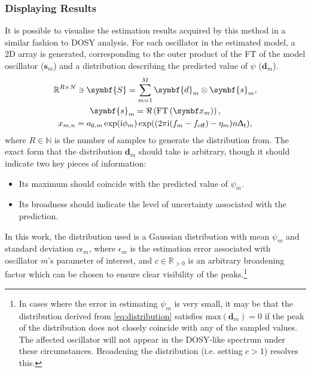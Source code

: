 \subsubsection{Displaying Results}
It is possible to visualise the estimation results acquired by this method in a
similar fashion to \ac{DOSY} analysis. For each oscillator in the estimated
model, a \ac{2D} array is generated, corresponding to the outer product of the
\ac{FT} of the model oscillator ($\symbf{s}_m$) and a distribution describing
the predicted value of $\psi$ ($\symbf{d}_m$).
\begin{subequations}
    \begin{gather}
        \mathbb{R}^{R \times N} \ni \symbf{S} = \sum_{m=1}^{M}
        \symbf{d}_m \otimes
        \symbf{s}_m ,\label{eq:dosy-spectrum}\\
        \symbf{s}_m = \Re\left(\FT\left(\bx_m\right)\right),\\
        x_{m,n} = a_{0,m} \exp(\iu \phi_m)
        \exp((2 \pi \iu (f_m - \foff) - \eta_m ) n \Dt),
    \end{gather}%
    \label{eq:dosy-cross-product}%
\end{subequations}
where $R \in \mathbb{N}$ is the number of samples to generate the distribution from.
The exact form that the distribution $\symbf{d}_m$ should take is arbitrary,
though it should indicate two key pieces of information:
\begin{itemize}
    \item Its maximum should coincide with the predicted value of $\psi_m$.
    \item Its broadness should indicate the level of uncertainty associated
        with the prediction.
\end{itemize}
In this work, the distribution used is a Gaussian distribution with mean
$\psi_m$ and standard deviation $c \epsilon_m$, where $\epsilon_m$ is the
estimation error associated with oscillator $m$'s parameter of interest, and $c
\in \mathbb{R}_{>0}$ is an arbitrary broadening factor which can be chosen to
ensure clear visibility of
the peaks.\footnote{
    In cases where the error in estimating $\psi_m$ is very small, it may be
    that the distribution derived from \cref{eq:distribution} satisfies
    $\text{max}(\symbf{d}_m)=0$ if the peak of the distribution does
    not closely coincide with any of the sampled values. The affected
    oscillator will not appear in the \ac{DOSY}-like spectrum under these
    circumstances.
    Broadening the distribution (i.e. setting $c > 1$) resolves this.
}

